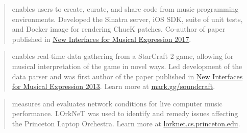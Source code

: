 

\begin{cvparagraph}


\begin{quote}
\thinspace enables users to create, curate, and share code from music programming environments. 
Developed the Sinatra server, iOS SDK, suite of unit tests, and Docker image for rendering ChucK patches. 
Co-author of paper published in \href{http://homes.create.aau.dk/dano/nime17/papers/0044/paper0044.pdf}{\underline{New Interfaces for Musical Expression 2017}}. 
\end{quote}

\begin{quote}
\thinspace enables real-time data gathering from a StarCraft 2 game, allowing for musical interpretation of the game in novel ways. 
Led development of the data parser and was first author of the paper published in \href{http://www.nime.org/proceedings/2013/nime2013_146.pdf}{\underline{New Interfaces for Musical Expression 2013}}. 
Learn more at \href{mark.gg/soundcraft}{\underline{mark.gg/soundcraft}}.
\end{quote}

\begin{quote}
\thinspace measures and evaluates network conditions for live computer music performance. 
LOrkNeT was used to identify and remedy issues affecting the Princeton Laptop Orchestra. 
Learn more at \href{lorknet.cs.princeton.edu}{\underline{lorknet.cs.princeton.edu}}.
\end{quote}

\end{cvparagraph}
